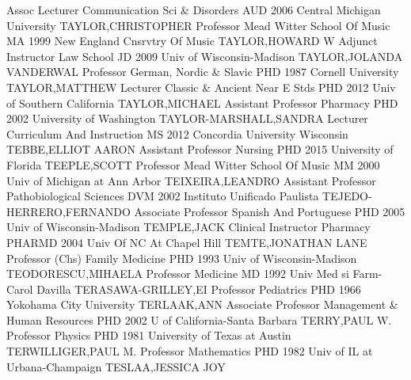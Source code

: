 \documentclass[
]{article}
\begin{document}
 \textbar Assoc Lecturer \textbar Communication Sci \&
Disorders \textbar AUD 2006 Central Michigan University
\textbar TAYLOR,CHRISTOPHER \textbar{}  \textbar Professor
\textbar Mead Witter School Of Music \textbar MA 1999 New England
Cnsrvtry Of Music \textbar TAYLOR,HOWARD W \textbar{} 
\textbar Adjunct Instructor \textbar Law School \textbar JD 2009 Univ of
Wisconsin-Madison \textbar TAYLOR,JOLANDA VANDERWAL \textbar{}
 \textbar Professor \textbar German, Nordic \& Slavic
\textbar PHD 1987 Cornell University \textbar TAYLOR,MATTHEW \textbar{}
 \textbar Lecturer \textbar Classic \& Ancient Near E Stds
\textbar PHD 2012 Univ of Southern California \textbar TAYLOR,MICHAEL
\textbar{}  \textbar Assistant Professor \textbar Pharmacy
\textbar PHD 2002 University of Washington
\textbar TAYLOR-MARSHALL,SANDRA \textbar{} 
\textbar Lecturer \textbar Curriculum And Instruction \textbar MS 2012
Concordia University Wisconsin \textbar TEBBE,ELLIOT AARON \textbar{}
 \textbar Assistant Professor \textbar Nursing \textbar PHD
2015 University of Florida \textbar TEEPLE,SCOTT \textbar{} 
\textbar Professor \textbar Mead Witter School Of Music \textbar MM 2000
Univ of Michigan at Ann Arbor \textbar TEIXEIRA,LEANDRO \textbar{}
 \textbar Assistant Professor \textbar Pathobiological
Sciences \textbar DVM 2002 Instituto Unificado Paulista
\textbar TEJEDO-HERRERO,FERNANDO \textbar{} 
\textbar Associate Professor \textbar Spanish And Portuguese
\textbar PHD 2005 Univ of Wisconsin-Madison \textbar TEMPLE,JACK
\textbar{}  \textbar Clinical Instructor \textbar Pharmacy
\textbar PHARMD 2004 Univ Of NC At Chapel Hill \textbar TEMTE,JONATHAN
LANE \textbar{}  \textbar Professor (Chs) \textbar Family
Medicine \textbar PHD 1993 Univ of Wisconsin-Madison
\textbar TEODORESCU,MIHAELA \textbar{}  \textbar Professor
\textbar Medicine \textbar MD 1992 Univ Med si Farm-Carol Davilla
\textbar TERASAWA-GRILLEY,EI \textbar{}  \textbar Professor
\textbar Pediatrics \textbar PHD 1966 Yokohama City University
\textbar TERLAAK,ANN \textbar{}  \textbar Associate
Professor \textbar Management \& Human Resources \textbar PHD 2002 U of
California-Santa Barbara \textbar TERRY,PAUL W. \textbar{} 
\textbar Professor \textbar Physics \textbar PHD 1981 University of
Texas at Austin \textbar TERWILLIGER,PAUL M. \textbar{} 
\textbar Professor \textbar Mathematics \textbar PHD 1982 Univ of IL at
Urbana-Champaign \textbar TESLAA,JESSICA JOY \textbar{} 
\end{document}
